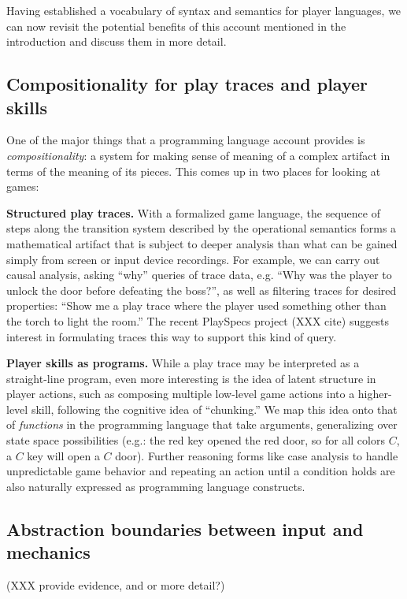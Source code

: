 Having established a vocabulary of syntax and semantics for player
languages, we can now revisit the potential benefits of this account
mentioned in the introduction and discuss them in more detail.

\subsection{Compositionality for play traces and player skills}

One of the major things that a programming language account provides is
{\em compositionality}: a system for making sense of meaning of a complex
artifact in terms of the meaning of its pieces. This comes up in two places
for looking at games:

{\bf Structured play traces.} With a formalized game language, the sequence
of steps along the transition system described by the operational semantics
forms a mathematical artifact that is subject to deeper analysis than what
can be gained simply from screen or input device recordings. For example,
we can carry out causal analysis, asking ``why'' queries of trace data,
e.g. ``Why was the player to unlock the door before defeating the boss?'',
as well as filtering traces for desired properties: ``Show me a play trace
where the player used something other than the torch to light the room.''
The recent PlaySpecs project (XXX cite) suggests interest in formulating
traces this way to support this kind of query.

{\bf Player skills as programs.} While a play trace may be interpreted as a
straight-line program, even more interesting is the idea of latent
structure in player actions, such as composing multiple low-level game
actions into a higher-level skill, following the cognitive idea of
``chunking.'' We map this idea onto that of {\em functions} in the
programming language that take arguments, generalizing over state space
possibilities (e.g.: the red key opened the red door, so for all colors
$C$, a $C$ key will open a $C$ door). Further reasoning forms like case
analysis to handle unpredictable game behavior and repeating an action
until a condition holds are also naturally expressed as programming
language constructs.


\subsection{Abstraction boundaries between input and mechanics}

(XXX provide evidence, and or more detail?)

